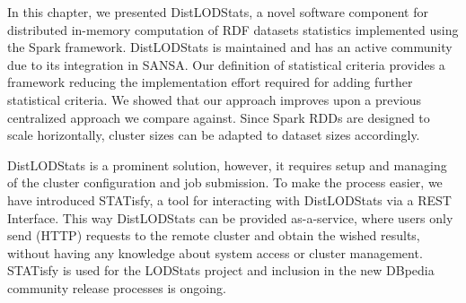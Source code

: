 In this chapter, we presented DistLODStats, a novel software component for distributed in-memory computation of \gls{RDF} datasets statistics implemented using the Spark framework.
DistLODStats is maintained and has an active community due to its integration in SANSA. 
Our definition of statistical criteria provides a framework reducing the implementation effort required for adding further statistical criteria. 
We showed that our approach improves upon a previous centralized approach we compare against.
Since Spark \gls{RDD}s are designed to scale horizontally, cluster sizes can be adapted to dataset sizes accordingly. 

DistLODStats is a prominent solution, however, it requires setup and managing of the cluster configuration and job submission.
To make the process easier, we have introduced STATisfy, a tool for interacting with DistLODStats via a REST Interface.
This way DistLODStats can be provided as-a-service, where users only send (HTTP) requests to the remote cluster and obtain the wished results, without having any knowledge about system access or cluster management.
STATisfy is used for the LODStats project and inclusion in the new DBpedia community release processes is ongoing.